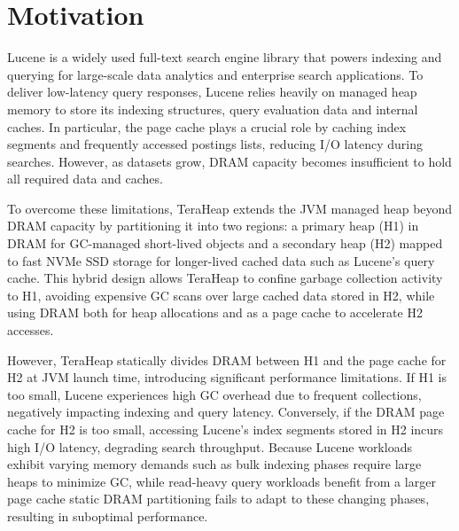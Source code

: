 \section{Motivation}



Lucene is a widely used full-text search engine library that powers indexing and
querying for large-scale data analytics and enterprise search applications. To
deliver low-latency query responses, Lucene relies heavily on managed heap
memory to store its indexing structures, query evaluation data and internal
caches. In particular, the page cache plays a crucial role by caching index
segments and frequently accessed postings lists, reducing I/O latency during
searches. However, as datasets grow, DRAM capacity becomes insufficient to hold
all required data and caches.

To overcome these limitations, TeraHeap extends the JVM managed heap beyond DRAM capacity by partitioning 
it into two regions: a primary heap (H1) in DRAM for GC-managed short-lived objects and a secondary heap 
(H2) mapped to fast NVMe SSD storage for longer-lived cached data such as Lucene’s query cache. This hybrid 
design allows TeraHeap to confine garbage collection activity to H1, avoiding expensive GC scans over large
cached data stored in H2, while using DRAM both for heap allocations and as a page cache to accelerate H2 accesses.

However, TeraHeap statically divides DRAM between H1 and the page cache for H2 at JVM launch time, introducing 
significant performance limitations. If H1 is too small, Lucene experiences high GC overhead due to frequent collections, 
negatively impacting indexing and query latency. Conversely, if the DRAM page cache for H2 is too small, accessing Lucene’s 
index segments stored in H2 incurs high I/O latency, degrading search throughput. Because Lucene workloads exhibit varying 
memory demands such as bulk indexing phases require large heaps to minimize GC, while read-heavy query workloads benefit 
from a larger page cache static DRAM partitioning fails to adapt to these changing phases, resulting in suboptimal performance.

